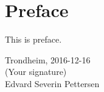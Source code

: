 
\newpage
{}
\section*{Preface}

This is preface.\\[2cm]

\begin{center}
Trondheim, 2016-12-16\\[1pc]
(Your signature)\\[1pc]
Edvard Severin Pettersen
\end{center}